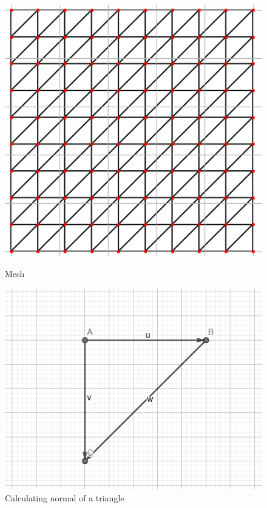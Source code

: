 \begin{figure}[H]
    \centering
    \begin{minipage}[t]{0.45\textwidth}
        \centering
        \includegraphics[width=\textwidth]{images/mesh_eg.png}
        \caption{Mesh}
        \label{fig:mesh_eg}
    \end{minipage}
    \hfill
    \begin{minipage}[t]{0.45\textwidth}
        \centering
        \includegraphics[width=\textwidth]{images/normal_eg.png}
        \caption{Calculating normal of a triangle}
        \label{fig:normal_eg}
    \end{minipage}
\end{figure}

